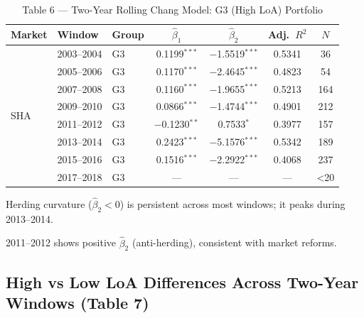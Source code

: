 \documentclass[12pt, a4paper]{article}
\begin{document}
\begin{table}[H]
  \centering
  \caption{Table 6 — Two-Year Rolling Chang Model: G3 (High LoA) Portfolio}
  \label{tab:rolling}
  \begin{threeparttable}
  \small
  \begin{tabular}{lllcccc}
    \toprule
    Market & Window & Group & $\hat\beta_1$ & $\hat\beta_2$ & Adj.~$R^2$ & $N$ \\
    \midrule
    \multirow{8}{*}{SHA}
      & 2003--2004 & G3 & 0.1199$^{***}$ & $-$1.5519$^{***}$ & 0.5341 & 36  \\
      & 2005--2006 & G3 & 0.1170$^{***}$ & $-$2.4645$^{***}$ & 0.4823 & 54  \\
      & 2007--2008 & G3 & 0.1160$^{***}$ & $-$1.9655$^{***}$ & 0.5213 & 164 \\
      & 2009--2010 & G3 & 0.0866$^{***}$ & $-$1.4744$^{***}$ & 0.4901 & 212 \\
      & 2011--2012 & G3 & $-$0.1230$^{**}$  &  0.7533$^{*}$  & 0.3977 & 157 \\
      & 2013--2014 & G3 & 0.2423$^{***}$ & $-$5.1576$^{***}$ & 0.5342 & 189 \\
      & 2015--2016 & G3 & 0.1516$^{***}$ & $-$2.2922$^{***}$ & 0.4068 & 237 \\
      & 2017--2018 & G3 &  ---           &  ---              &   ---  &  <20 \\
    \bottomrule
  \end{tabular}
  \begin{tablenotes}
    \footnotesize
    \item Herding curvature ($\hat\beta_2 < 0$) is persistent across most windows; it peaks during 2013--2014.
    \item 2011--2012 shows positive $\hat\beta_2$ (anti-herding), consistent with market reforms.
  \end{tablenotes}
  \end{threeparttable}
\end{table}

\subsection{High vs Low LoA Differences Across Two-Year Windows (Table 7)}
\end{document}
